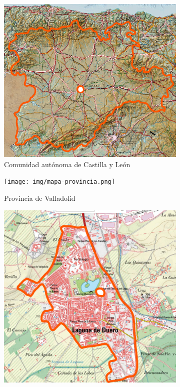 \begin{figure}[H]
    \centering
    \begin{subfigure}[H]{0.48\textwidth}
        \centering
        \includegraphics*[width=\textwidth]{img/mapa-comunidad.png}
        \caption{Comunidad autónoma de Castilla y León}
    \end{subfigure}
    \hfill
    \begin{subfigure}[H]{0.48\textwidth}
        \centering
        \texttt{[image: img/mapa-provincia.png]}
        \caption{Provincia de Valladolid}
    \end{subfigure}
    \hfill
    \begin{subfigure}[H]{0.48\textwidth}
        \centering
        \includegraphics*[width=\textwidth]{img/mapa-municipio.png}

\end{subfigure}
\end{figure}
